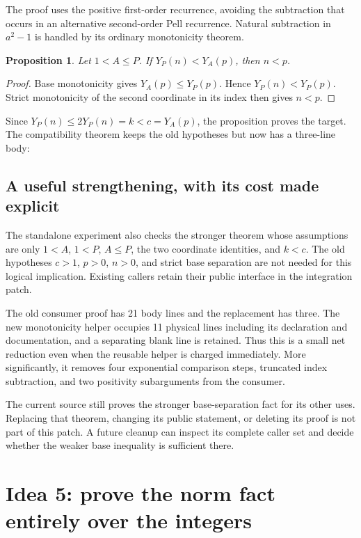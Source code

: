 \documentclass[11pt,letterpaper]{article}
\newtheorem{proposition}{Proposition}[section]
\begin{document}

The proof uses the positive first-order recurrence, avoiding the subtraction
that occurs in an alternative second-order Pell recurrence. Natural
subtraction in $a^2-1$ is handled by its ordinary monotonicity theorem.

\begin{proposition}
Let $1<A\le P$. If $Y_P(n)<Y_A(p)$, then $n<p$.
\end{proposition}
\begin{proof}
Base monotonicity gives $Y_A(p)\le Y_P(p)$. Hence
$Y_P(n)<Y_P(p)$. Strict monotonicity of the second coordinate in its index
then gives $n<p$.
\end{proof}

Since $Y_P(n)\le 2Y_P(n)=k<c=Y_A(p)$, the proposition proves the target.
The compatibility theorem keeps the old hypotheses but now has a three-line
body:


\subsection{A useful strengthening, with its cost made explicit}

The standalone experiment also checks the stronger theorem whose assumptions
are only $1<A$, $1<P$, $A\le P$, the two coordinate identities, and $k<c$.
The old hypotheses $c>1$, $p>0$, $n>0$, and strict base separation are not
needed for this logical implication. Existing callers retain their public
interface in the integration patch.

The old consumer proof has 21 body lines and the replacement has three. The
new monotonicity helper occupies 11 physical lines including its declaration
and documentation, and a separating blank line is retained. Thus this is a
small net reduction even when the reusable helper is charged immediately.
More significantly, it removes four exponential comparison steps, truncated
index subtraction, and two positivity subarguments from the consumer.

The current source still proves the stronger base-separation fact for its
other uses. Replacing that theorem, changing its public statement, or deleting
its proof is not part of this patch. A future cleanup can inspect its complete
caller set and decide whether the weaker base inequality is sufficient there.

\section{Idea 5: prove the norm fact entirely over the integers}
\end{document}

